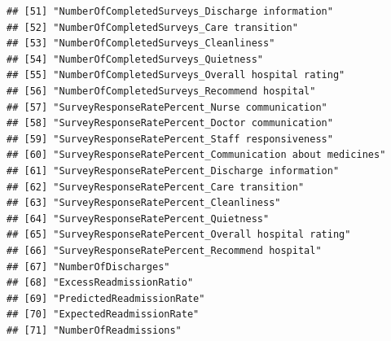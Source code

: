 \documentclass[
]{article}
\begin{document}
\begin{verbatim}
## [51] "NumberOfCompletedSurveys_Discharge information"                                                                                           
## [52] "NumberOfCompletedSurveys_Care transition"                                                                                                 
## [53] "NumberOfCompletedSurveys_Cleanliness"                                                                                                     
## [54] "NumberOfCompletedSurveys_Quietness"                                                                                                       
## [55] "NumberOfCompletedSurveys_Overall hospital rating"                                                                                         
## [56] "NumberOfCompletedSurveys_Recommend hospital"                                                                                              
## [57] "SurveyResponseRatePercent_Nurse communication"                                                                                            
## [58] "SurveyResponseRatePercent_Doctor communication"                                                                                           
## [59] "SurveyResponseRatePercent_Staff responsiveness"                                                                                           
## [60] "SurveyResponseRatePercent_Communication about medicines"                                                                                  
## [61] "SurveyResponseRatePercent_Discharge information"                                                                                          
## [62] "SurveyResponseRatePercent_Care transition"                                                                                                
## [63] "SurveyResponseRatePercent_Cleanliness"                                                                                                    
## [64] "SurveyResponseRatePercent_Quietness"                                                                                                      
## [65] "SurveyResponseRatePercent_Overall hospital rating"                                                                                        
## [66] "SurveyResponseRatePercent_Recommend hospital"                                                                                             
## [67] "NumberOfDischarges"                                                                                                                       
## [68] "ExcessReadmissionRatio"                                                                                                                   
## [69] "PredictedReadmissionRate"                                                                                                                 
## [70] "ExpectedReadmissionRate"                                                                                                                  
## [71] "NumberOfReadmissions"
\end{verbatim}
\end{document}
